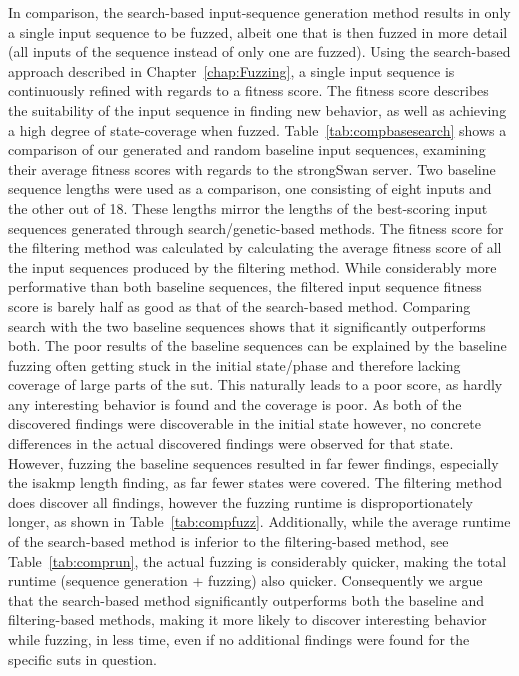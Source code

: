 In comparison, the search-based input-sequence generation method results in only a single input sequence to be fuzzed, albeit one that is then fuzzed in more detail (all inputs of the sequence instead of only one are fuzzed). Using the search-based approach described in Chapter~\ref{chap:Fuzzing}, a single input sequence is continuously refined with regards to a fitness score. The fitness score describes the suitability of the input sequence in finding new behavior, as well as achieving a high degree of state-coverage when fuzzed. Table~\ref{tab:compbasesearch} shows a comparison of our generated and random baseline input sequences, examining their average fitness scores with regards to the strongSwan server. Two baseline sequence lengths were used as a comparison, one consisting of eight inputs and the other out of 18. These lengths mirror the lengths of the best-scoring input sequences generated through search/genetic-based methods. The fitness score for the filtering method was calculated by calculating the average fitness score of all the input sequences produced by the filtering method. While considerably more performative than both baseline sequences, the filtered input sequence fitness score is barely half as good as that of the search-based method. Comparing search with the two baseline sequences shows that it significantly outperforms both. The poor results of the baseline sequences can be explained by the baseline fuzzing often getting stuck in the initial state/phase and therefore lacking coverage of large parts of the \ac{sut}. This naturally leads to a poor score, as hardly any interesting behavior is found and the coverage is poor. As both of the discovered findings were discoverable in the initial state however, no concrete differences in the actual discovered findings were observed for that state. However, fuzzing the baseline sequences resulted in far fewer findings, especially the \ac{isakmp} length finding, as far fewer states were covered. The filtering method does discover all findings, however the fuzzing runtime is disproportionately longer, as shown in Table~\ref{tab:compfuzz}. Additionally, while the average runtime of the search-based method is inferior to the filtering-based method, see Table~\ref{tab:comprun}, the actual fuzzing is considerably quicker, making the total runtime (sequence generation + fuzzing) also quicker. Consequently we argue that the search-based method significantly outperforms both the baseline and filtering-based methods, making it more likely to discover interesting behavior while fuzzing, in less time, even if no additional findings were found for the specific \acp{sut} in question. 

